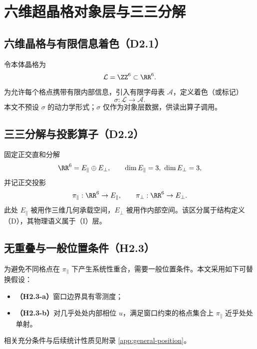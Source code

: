 \section{六维超晶格对象层与三三分解}

\subsection{六维晶格与有限信息着色（D2.1）}

令本体晶格为
\[
\mathcal{L}=\ZZ^{6}\subset \RR^{6}.
\]
为允许每个格点携带有限内部信息，引入有限字母表 $\mathcal{A}$，定义着色（或标记）
\[
\sigma:\mathcal{L}\to \mathcal{A}.
\]
本文不预设 $\sigma$ 的动力学形式；$\sigma$ 仅作为对象层数据，供读出算子调用。

\subsection{三三分解与投影算子（D2.2）}

固定正交直和分解
\[
\RR^{6}=E_{\parallel}\oplus E_{\perp},\qquad \dim E_{\parallel}=3,\ \dim E_{\perp}=3,
\]
并记正交投影
\[
\pi_{\parallel}:\RR^{6}\to E_{\parallel},\qquad
\pi_{\perp}:\RR^{6}\to E_{\perp}.
\]
此处 $E_{\parallel}$ 被用作三维几何承载空间，$E_{\perp}$ 被用作内部空间。该区分属于结构定义（D），其物理语义属于（I）层。

\subsection{无重叠与一般位置条件（H2.3）}

为避免不同格点在 $\pi_{\parallel}$ 下产生系统性重合，需要一般位置条件。本文采用如下可替换假设：
\begin{itemize}
  \item \textbf{（H2.3-a）}窗口边界具有零测度；
  \item \textbf{（H2.3-b）}对几乎处处内部相位 $u$，满足窗口约束的格点集合上 $\pi_{\parallel}$ 近乎处处单射。
\end{itemize}
相关充分条件与后续统计性质见附录 \ref{app:general-position}。

